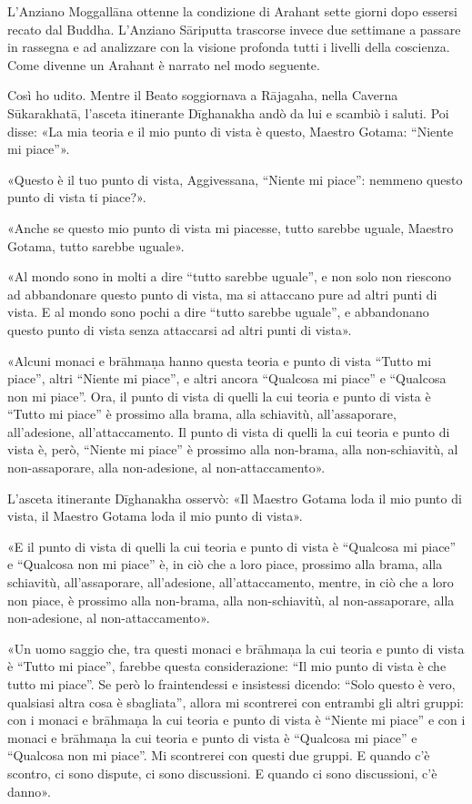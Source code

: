  L’Anziano Moggallāna ottenne la condizione di
Arahant sette giorni dopo essersi recato dal Buddha. L’Anziano Sāriputta
trascorse invece due settimane a passare in rassegna e ad analizzare con
la visione profonda tutti i livelli della coscienza. Come divenne un
Arahant è narrato nel modo seguente.


 Così ho udito. Mentre il Beato soggiornava a Rājagaha, nella
Caverna Sūkarakhatā, l’asceta itinerante Dīghanakha andò da lui e
scambiò i saluti. Poi disse: «La mia teoria e il mio punto di vista è
questo, Maestro Gotama: “Niente mi piace”».


«Questo è il tuo punto di vista, Aggivessana, “Niente mi piace”: nemmeno
questo punto di vista ti piace?».


«Anche se questo mio punto di vista mi piacesse, tutto sarebbe uguale,
Maestro Gotama, tutto sarebbe uguale».


«Al mondo sono in molti a dire “tutto sarebbe uguale”, e non solo non
riescono ad abbandonare questo punto di vista, ma si attaccano pure ad
altri punti di vista. E al mondo sono pochi a dire “tutto sarebbe
uguale”, e abbandonano questo punto di vista senza attaccarsi ad altri
punti di vista».


«Alcuni monaci e brāhmaṇa hanno questa teoria e punto di vista “Tutto mi
piace”, altri “Niente mi piace”, e altri ancora “Qualcosa mi piace” e
“Qualcosa non mi piace”. Ora, il punto di vista di quelli la cui teoria
e punto di vista è “Tutto mi piace” è prossimo alla brama, alla
schiavitù, all’assaporare, all’adesione, all’attaccamento. Il punto di
vista di quelli la cui teoria e punto di vista è, però, “Niente mi
piace” è prossimo alla non-brama, alla non-schiavitù, al non-assaporare,
alla non-adesione, al non-attaccamento».


L’asceta itinerante Dīghanakha osservò: «Il Maestro Gotama loda il mio
punto di vista, il Maestro Gotama loda il mio punto di vista».


«E il punto di vista di quelli la cui teoria e punto di vista è
“Qualcosa mi piace” e “Qualcosa non mi piace” è, in ciò che a loro
piace, prossimo alla brama, alla schiavitù, all’assaporare,
all’adesione, all’attaccamento, mentre, in ciò che a loro non piace, è
prossimo alla non-brama, alla non-schiavitù, al non-assaporare, alla
non-adesione, al non-attaccamento».


«Un uomo saggio che, tra questi monaci e brāhmaṇa la cui teoria e punto
di vista è “Tutto mi piace”, farebbe questa considerazione: “Il mio
punto di vista è che tutto mi piace”. Se però lo fraintendessi e
insistessi dicendo: “Solo questo è vero, qualsiasi altra cosa è
sbagliata”, allora mi scontrerei con entrambi gli altri gruppi: con i
monaci e brāhmaṇa la cui teoria e punto di vista è “Niente mi piace” e
con i monaci e brāhmaṇa la cui teoria e punto di vista è “Qualcosa mi
piace” e “Qualcosa non mi piace”. Mi scontrerei con questi due gruppi. E
quando c’è scontro, ci sono dispute, ci sono discussioni. E quando ci
sono discussioni, c’è danno».


